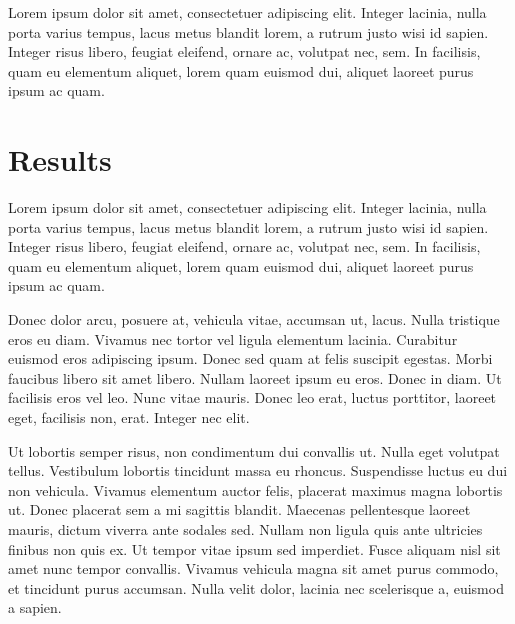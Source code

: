 \documentclass[thesismargins, english, thesislinespacing, twoside, openright, upjsfrontpage]{rnthesis}
\begin{document}
Lorem ipsum dolor sit amet, consectetuer adipiscing elit.
Integer lacinia, nulla porta varius tempus, lacus metus blandit
lorem, a rutrum justo wisi id sapien. Integer risus libero,
feugiat eleifend, ornare ac, volutpat nec, sem. In facilisis,
quam eu elementum aliquet, lorem quam euismod dui, aliquet
laoreet purus ipsum ac quam.

\chapter{Results}

Lorem ipsum dolor sit amet, consectetuer adipiscing elit.
Integer lacinia, nulla porta varius tempus, lacus metus blandit
lorem, a rutrum justo wisi id sapien. Integer risus libero,
feugiat eleifend, ornare ac, volutpat nec, sem. In facilisis,
quam eu elementum aliquet, lorem quam euismod dui, aliquet
laoreet purus ipsum ac quam.

Donec dolor arcu, posuere at, vehicula vitae, accumsan ut,
lacus. Nulla tristique eros eu diam. Vivamus nec tortor vel
ligula elementum lacinia. Curabitur euismod eros adipiscing
ipsum. Donec sed quam at felis suscipit egestas. Morbi faucibus
libero sit amet libero. Nullam laoreet ipsum eu eros. Donec in
diam. Ut facilisis eros vel leo. Nunc vitae mauris. Donec leo
erat, luctus porttitor, laoreet eget, facilisis non, erat.
Integer nec elit.

\zaver

Ut lobortis semper risus, non condimentum dui convallis ut. Nulla eget volutpat tellus. Vestibulum lobortis tincidunt massa eu rhoncus. Suspendisse luctus eu dui non vehicula. Vivamus elementum auctor felis, placerat maximus magna lobortis ut. Donec placerat sem a mi sagittis blandit. Maecenas pellentesque laoreet mauris, dictum viverra ante sodales sed. Nullam non ligula quis ante ultricies finibus non quis ex. Ut tempor vitae ipsum sed imperdiet. Fusce aliquam nisl sit amet nunc tempor convallis. Vivamus vehicula magna sit amet purus commodo, et tincidunt purus accumsan. Nulla velit dolor, lacinia nec scelerisque a, euismod a sapien.
%
\end{document}
